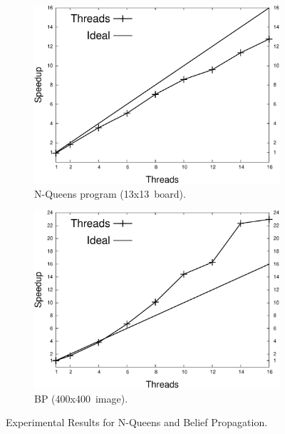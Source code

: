 \begin{figure}[h]
   \vspace{-0.5\intextsep}
   \centering
   \begin{subfigure}[b]{\plotsize}
      \includegraphics[width=\textwidth]{speedup_8queens-13.pdf}
      \caption{N-Queens program (13x13~board).}
      \label{exp:8queens}
   \end{subfigure}
   \begin{subfigure}[b]{\plotsize}
      \includegraphics[width=\textwidth]{speedup_bp-400.pdf}
      \caption{BP (400x400~image).}
      \label{exp:bp}
   \end{subfigure}
   \caption{Experimental Results for N-Queens and Belief Propagation.}
   \vspace{-0.8\intextsep}
\end{figure}


